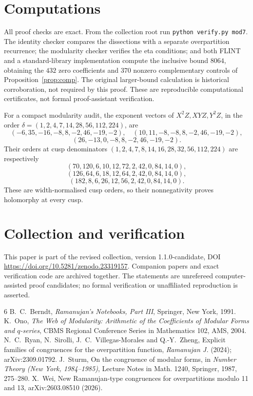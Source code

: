 \documentclass[11pt]{article}
\theoremstyle{remark}\newtheorem{remark}[theorem]{Remark}
\begin{document}
\section{Computations}
All proof checks are exact. From the collection root run \texttt{python verify.py mod7}. The identity checker compares the dissections with a separate overpartition recurrence; the modularity checker verifies the eta conditions; and both FLINT and a standard-library implementation compute the inclusive bound $8064$, obtaining the $432$ zero coefficients and $370$ nonzero complementary controls of Proposition~\ref{prop:comp}. The original larger-bound calculation is historical corroboration, not required by this proof. These are reproducible computational certificates, not formal proof-assistant verification.

For a compact modularity audit, the exponent vectors of $X^2Z,XYZ,Y^2Z$, in the order $\delta=(1,2,4,7,14,28,56,112,224)$, are
\[(-6,35,-16,-8,8,-2,46,-19,-2),\quad
(10,11,-8,-8,8,-2,46,-19,-2),\]
\[(26,-13,0,-8,8,-2,46,-19,-2).\]
Their orders at cusp denominators $(1,2,4,7,8,14,16,28,32,56,112,224)$ are respectively
\[(70,120,6,10,12,72,2,42,0,84,14,0),\]
\[(126,64,6,18,12,64,2,42,0,84,14,0),\]
\[(182,8,6,26,12,56,2,42,0,84,14,0).\]
These are width-normalised cusp orders, so their nonnegativity proves holomorphy at every cusp.

\section*{Collection and verification}
This paper is part of the revised collection, version 1.1.0-candidate, DOI \url{https://doi.org/10.5281/zenodo.23319157}. Companion papers and exact verification code are archived together. The statements are unrefereed computer-assisted proof candidates; no formal verification or unaffiliated reproduction is asserted.

\begin{thebibliography}{6}
 B.~C.~Berndt, \emph{Ramanujan's Notebooks, Part III}, Springer, New York, 1991.
 K.~Ono, \emph{The Web of Modularity: Arithmetic of the Coefficients of Modular Forms and $q$-series}, CBMS Regional Conference Series in Mathematics 102, AMS, 2004.
 N.~C.~Ryan, N.~Sirolli, J.~C.~Villegas-Morales and Q.-Y.~Zheng, Explicit families of congruences for the overpartition function, \emph{Ramanujan J.} (2024); arXiv:2309.01792.
 J.~Sturm, On the congruence of modular forms, in \emph{Number Theory (New York, 1984--1985)}, Lecture Notes in Math. 1240, Springer, 1987, 275--280.
 X.~Wei, New Ramanujan-type congruences for overpartitions modulo 11 and 13, arXiv:2603.08510 (2026).
\end{thebibliography}
\end{document}
